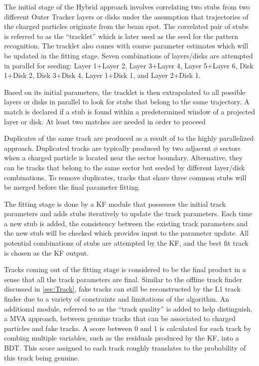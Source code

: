 The initial stage of the Hybrid approach involves correlating two stubs from two different Outer Tracker layers or disks under the assumption that trajectories of the charged particles originate from the beam spot. The correlated pair of stubs is referred to as the ``tracklet'' which is later used as the seed for the pattern recognition. The tracklet also comes with coarse parameter estimates which will be updated in the fitting stage. Seven combinations of layers/disks are attempted in parallel for seeding: Layer 1+Layer 2, Layer 3+Layer 4, Layer 5+Layer 6, Disk 1+Disk 2, Disk 3+Disk 4, Layer 1+Disk 1, and Layer 2+Disk 1. 

Based on its initial parameters, the tracklet is then extrapolated to all possible layers or disks in parallel to look for stubs that belong to the same trajectory. A match is declared if a stub is found within a predetermined window of a projected layer or disk. At least two matches are needed in order to proceed 

Duplicates of the same track are produced as a result of to the highly parallelized approach. Duplicated tracks are typically produced by two adjacent  $\phi$ sectors when a charged particle is located near the sector boundary. Alternative, they can be tracks that belong to the same sector but seeded by different layer/disk combinations. To remove duplicates, tracks that share three common stubs will be merged before the final parameter fitting. 

The fitting stage is done by a \ac{KF} module that possesses the initial track parameters and adds stubs iteratively to update the track parameters. Each time a new stub is added, the consistency between the existing track parameters and the new stub will be checked which provides input to the parameter update. All potential combinations of stubs are attempted by the \ac{KF}, and the best fit track is chosen as the \ac{KF} output. 

Tracks coming out of the fitting stage is considered to be the final product in a sense that all the track parameters are final.  Similar to the offline track finder discussed in \ref{sec:Track}, fake tracks can still be reconstructed by the \ac{L1} track finder due to a variety of constraints and limitations of the algorithm. An additional module, referred to as the ``track quality'' is added to help distinguish, a \ac{MVA} approach,  between genuine tracks that can be associated to charged particles and fake tracks. A score between 0 and 1 is calculated for each track by combing multiple variables, such as the residuals produced by the \ac{KF}, into a \ac{BDT}. This score assigned to each track roughly translates to the probability of this track being genuine.

